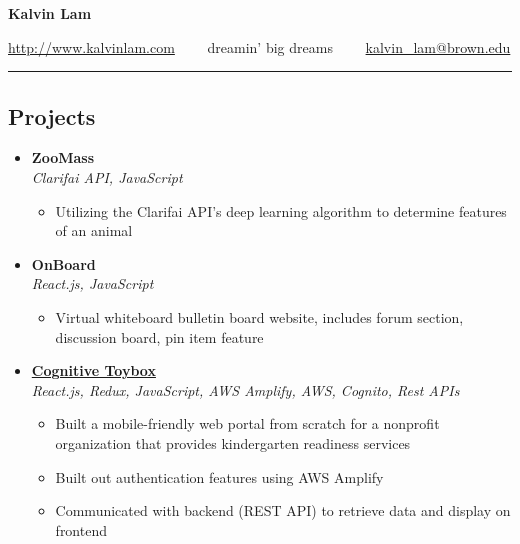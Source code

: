 \documentclass[10pt,letterpaper]{article}
\begin{document}
\begin{center}
{\huge \textbf{Kalvin Lam}}


\href{http://www.kalvinlam.com}{http://www.kalvinlam.com}\ \ \textbullet
\ \ dreamin' big dreams\ \ \textbullet
\ \ \href{malto:kalvin_lam@brown.edu}{kalvin\_lam@brown.edu}

\end{center}

\hrule
\vspace{-1.0em}
\subsection*{Projects}
  \begin{itemize}
    \parskip=-0.5em
    \item[]
    {\textbf{ZooMass} \hfill
      \textbf{}}
    \\
    {\emph{Clarifai API, JavaScript} \hfill \emph{}}

    \begin{itemize}[label=\textbullet]
      \itemsep0em
      \item Utilizing the Clarifai API's deep learning algorithm to determine features of an animal
    \end{itemize}
     \item[]
    {\textbf{OnBoard} \hfill
      \textbf{}}
    \\
    {\emph{React.js, JavaScript} \hfill \emph{}}

    \begin{itemize}[label=\textbullet]
      \itemsep0em
      \item Virtual whiteboard bulletin board website, includes forum section,
discussion board, pin item feature
    \end{itemize}
     \item[]
    {\href{http://www.cognitivetoybox.com/}{\textbf{Cognitive Toybox}} \hfill
      \textbf{}}
    \\
    {\emph{React.js, Redux, JavaScript, AWS Amplify, AWS, Cognito, Rest APIs} \hfill \emph{}}

    \begin{itemize}[label=\textbullet]
      \itemsep0em
      \item Built a mobile-friendly web portal from scratch for a nonprofit organization that provides kindergarten readiness services 
      \item Built out authentication features using AWS Amplify
      \item Communicated with backend (REST API) to retrieve data and display on frontend
    \end{itemize}
    
\end{itemize}
\end{document}
